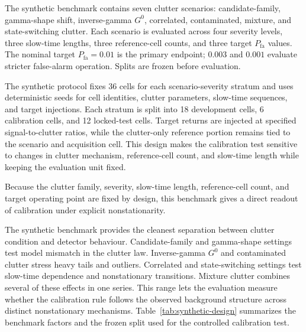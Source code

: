 \documentclass[preprint,12pt]{elsarticle}
\begin{document}
The synthetic benchmark contains seven clutter scenarios:
candidate-family, gamma-shape shift, inverse-gamma $G^0$, correlated,
contaminated, mixture, and state-switching clutter. Each scenario is evaluated
across four severity levels, three slow-time lengths, three reference-cell
counts, and three target $P_{\mathrm{fa}}$ values. The nominal target
$P_{\mathrm{fa}}=0.01$ is the primary endpoint; $0.003$ and $0.001$ evaluate
stricter false-alarm operation. Splits are frozen before evaluation.

The synthetic protocol fixes 36 cells for each scenario-severity stratum and
uses deterministic seeds for cell identities, clutter parameters, slow-time
sequences, and target injections. Each stratum is split into 18 development
cells, 6 calibration cells, and 12 locked-test cells. Target returns are injected
at specified signal-to-clutter ratios, while the clutter-only reference portion
remains tied to the scenario and acquisition cell. This design makes the
calibration test sensitive to changes in clutter mechanism, reference-cell
count, and slow-time length while keeping the evaluation unit fixed.

Because the clutter family, severity, slow-time length, reference-cell count,
and target operating point are fixed by design, this benchmark gives a direct
readout of calibration under explicit nonstationarity.

The synthetic benchmark provides the cleanest separation between clutter
condition and detector behaviour. Candidate-family and gamma-shape settings test
model mismatch in the clutter law. Inverse-gamma $G^0$ and contaminated clutter
stress heavy tails and outliers. Correlated and state-switching settings test
slow-time dependence and nonstationary transitions. Mixture clutter combines
several of these effects in one series. This range lets the evaluation measure
whether the calibration rule follows the observed background structure across
distinct nonstationary mechanisms. Table~\ref{tab:synthetic-design} summarizes
the benchmark factors and the frozen split used for the controlled calibration
test.
\end{document}
